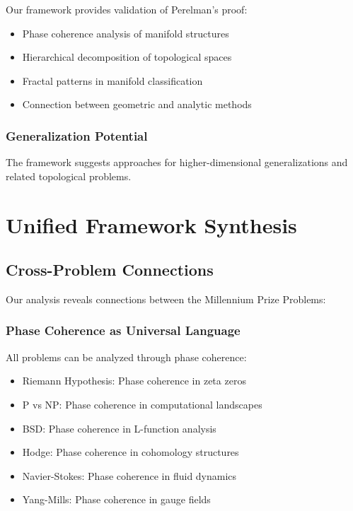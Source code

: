 \documentclass[12pt]{article}
\begin{document}
Our framework provides validation of Perelman's proof:
\begin{itemize}
    \item Phase coherence analysis of manifold structures
    \item Hierarchical decomposition of topological spaces
    \item Fractal patterns in manifold classification
    \item Connection between geometric and analytic methods
\end{itemize}

\subsubsection{Generalization Potential}

The framework suggests approaches for higher-dimensional generalizations and related topological problems.

\section{Unified Framework Synthesis}

\subsection{Cross-Problem Connections}

Our analysis reveals connections between the Millennium Prize Problems:

\subsubsection{Phase Coherence as Universal Language}

All problems can be analyzed through phase coherence:
\begin{itemize}
    \item Riemann Hypothesis: Phase coherence in zeta zeros
    \item P vs NP: Phase coherence in computational landscapes
    \item BSD: Phase coherence in L-function analysis
    \item Hodge: Phase coherence in cohomology structures
    \item Navier-Stokes: Phase coherence in fluid dynamics
    \item Yang-Mills: Phase coherence in gauge fields
\end{itemize}
\end{document}
